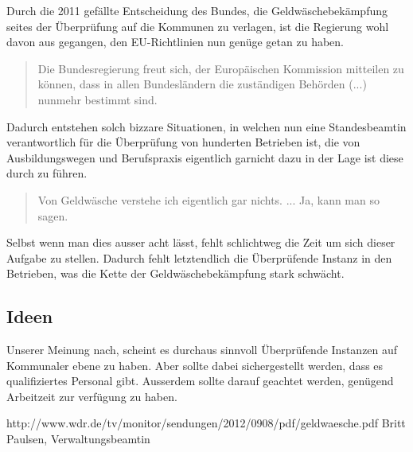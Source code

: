\documentclass{article}
\begin{document}
            Durch die 2011 gefällte Entscheidung des Bundes, die Geldwäschebekämpfung seites der Überprüfung auf die Kommunen zu verlagen, ist die Regierung wohl davon aus gegangen, den EU-Richtlinien nun genüge getan zu haben.
            \begin{quote} Die Bundesregierung freut sich, der Europäischen Kommission mitteilen zu können, dass in allen Bundesländern die zuständigen Behörden (...) nunmehr bestimmt sind. \cite{EUZeugs} \end{quote}
            Dadurch entstehen solch bizzare Situationen, in welchen nun eine Standesbeamtin verantwortlich für die Überprüfung von hunderten Betrieben ist, die von Ausbildungswegen und Berufspraxis eigentlich garnicht dazu in der Lage ist diese durch zu führen. \begin{quote} Von Geldwäsche verstehe ich eigentlich gar nichts. ... Ja, kann man so sagen. \cite{Beatmin} \end{quote} Selbst wenn man dies ausser acht lässt, fehlt schlichtweg die Zeit um sich dieser Aufgabe zu stellen. Dadurch fehlt letztendlich die Überprüfende Instanz in den Betrieben, was die Kette der Geldwäschebekämpfung stark schwächt.

        \subsection[Ideen]{Ideen}

            Unserer Meinung nach, scheint es durchaus sinnvoll Überprüfende Instanzen auf Kommunaler ebene zu haben. Aber sollte dabei sichergestellt werden, dass es qualifiziertes Personal gibt. Ausserdem sollte darauf geachtet werden, genügend Arbeitzeit zur verfügung zu haben.

\newpage

    \begin{thebibliography}{9}

         http://www.wdr.de/tv/monitor/sendungen/2012/0908/pdf/geldwaesche.pdf
         Britt Paulsen, Verwaltungsbeamtin
        
    \end{thebibliography}
\end{document}
